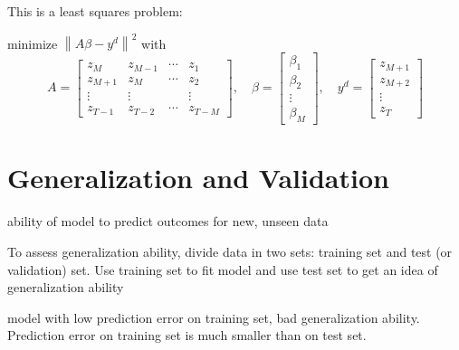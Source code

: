 \begin{problem}
    This is a least squares problem: 
    
    minimize $ \left\|A \beta-y^{{d}}\right\|^{2} $ with
\begin{equation}
A=\left[\begin{array}{cccc}
z_{M} & z_{M-1} & \cdots & z_{1} \\
z_{M+1} & z_{M} & \cdots & z_{2} \\
\vdots & \vdots & & \vdots \\
z_{T-1} & z_{T-2} & \cdots & z_{T-M}
\end{array}\right], \quad \beta=\left[\begin{array}{c}
\beta_{1} \\
\beta_{2} \\
\vdots \\
\beta_{M}
\end{array}\right], \quad y^{{d}}=\left[\begin{array}{c}
z_{M+1} \\
z_{M+2} \\
\vdots \\
z_{T}
\end{array}\right]
\end{equation}

\end{problem}



\section{Generalization and Validation}

\begin{definition}
    ability of model to predict outcomes for new, unseen data
\end{definition}

\begin{definition}
    To assess generalization ability, divide data in two sets: training set and test (or validation) set. Use training set to fit model and use test set to get an idea of generalization ability
\end{definition}

\begin{definition}
    model with low prediction error on training set, bad generalization ability. Prediction error on training set is much smaller than on test set.
\end{definition}


